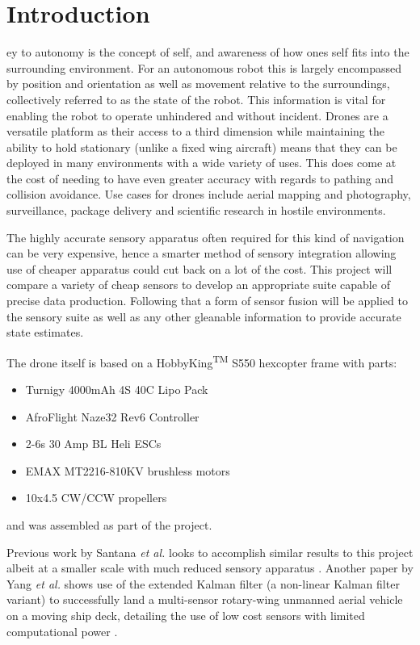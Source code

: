 \let\textcircled=\pgftextcircled
\chapter{Introduction}
\label{chap:intro}

ey to autonomy is the concept of self, and awareness of how ones self fits into the surrounding environment. For an autonomous robot this is largely encompassed by position and orientation as well as movement relative to the surroundings, collectively referred to as the state of the robot. This information is vital for enabling the robot to operate unhindered and without incident. Drones are a versatile platform as their access to a third dimension while maintaining the ability to hold stationary (unlike a fixed wing aircraft) means that they can be deployed in many environments with a wide variety of uses. This does come at the cost of needing to have even greater accuracy with regards to pathing and collision avoidance. Use cases for drones include aerial mapping and photography, surveillance, package delivery and scientific research in hostile environments. \par
	The highly accurate sensory apparatus often required for this kind of navigation can be very expensive, hence a smarter method of sensory integration allowing use of cheaper apparatus could cut back on a lot of the cost. This project will compare a variety of cheap sensors to develop an appropriate suite capable of precise data production. Following that a form of sensor fusion will be applied to the sensory suite as well as any other gleanable information to provide accurate state estimates. \par
    The drone itself is based on a HobbyKing\textsuperscript{TM} S550 hexcopter frame \cite{hobbyking2016s550} with parts:
\begin{itemize}
\item Turnigy 4000mAh 4S 40C Lipo Pack
\item AfroFlight Naze32 Rev6 Controller
\item 2-6s 30 Amp BL Heli ESCs
\item EMAX MT2216-810KV brushless motors
\item 10x4.5 CW/CCW propellers
\end{itemize}

and was assembled as part of the project.
\bigskip


Previous work by Santana \textit{et al.} looks to accomplish similar results to this project albeit at a smaller scale with much reduced sensory apparatus \cite{santana2014trajectory}.
	Another paper by Yang \textit{et al.} shows use of the extended Kalman filter (a non-linear Kalman filter variant) to successfully land a multi-sensor rotary-wing unmanned aerial vehicle on a moving ship deck, detailing the use of low cost sensors with limited computational power \cite{yang2011multi}. \par
    
